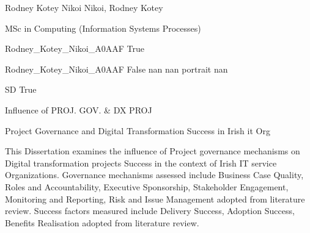 
\begingroup{}\relax



\def\Key{Rodney_Kotey_Nikoi_A0AAF}

{Rodney Kotey Nikoi}
{Nikoi, Rodney Kotey}

{MSc in Computing (Information Systems Processes)}

{Rodney_Kotey_Nikoi_A0AAF}
{True}

{Rodney_Kotey_Nikoi_A0AAF}
{False}
{nan}
{nan}
{portrait}
{nan}

{SD}
{True}

{Influence of PROJ. GOV. \& DX PROJ}

{Project Governance and Digital Transformation Success in Irish it Org}

{This Dissertation examines the influence of Project governance mechanisms on Digital transformation projects Success in the context of Irish IT service Organizations. Governance mechanisms assessed include Business Case Quality, Roles and Accountability, Executive Sponsorship, Stakeholder Engagement, Monitoring and Reporting, Risk and Issue Management adopted from literature review. Success factors measured include Delivery Success, Adoption Success, Benefits Realisation adopted from literature review.}

